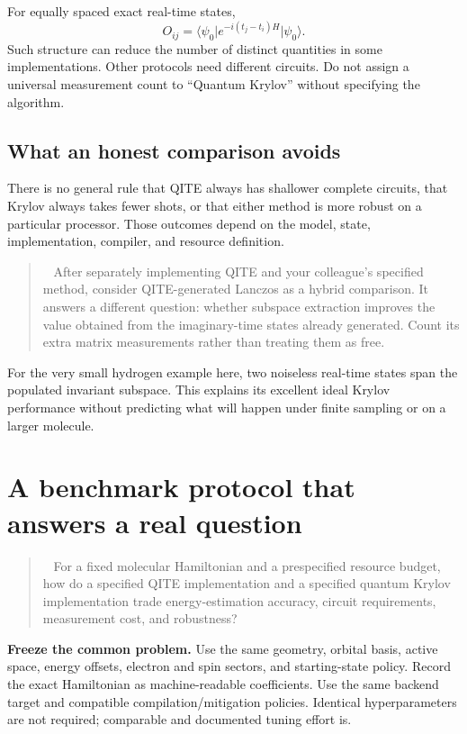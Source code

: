 \documentclass[11pt,a4paper]{article}
\newcommand{\ket}[1]{\lvert #1\rangle}
\newcommand{\bra}[1]{\langle #1\rvert}
\newcommand{\lesson}[2]{\clearpage\section{#1}\label{#2}}
\newenvironment{idea}[1][Main idea]{\par\smallskip\begin{quotation}\noindent{\bfseries\textcolor{keyblue}{#1.}}\ }{\end{quotation}\smallskip}
\begin{document}
For equally spaced exact real-time states,
\[
O_{ij}=\bra{\psi_0}e^{-i(t_j-t_i)H}\ket{\psi_0}.
\]
Such structure can reduce the number of distinct quantities in some implementations. Other protocols need different circuits. Do not assign a universal measurement count to ``Quantum Krylov'' without specifying the algorithm.

\subsection*{What an honest comparison avoids}
There is no general rule that QITE always has shallower complete circuits, that Krylov always takes fewer shots, or that either method is more robust on a particular processor. Those outcomes depend on the model, state, implementation, compiler, and resource definition.

\begin{idea}[A useful optional third arm]
After separately implementing QITE and your colleague's specified method, consider QITE-generated Lanczos as a hybrid comparison. It answers a different question: whether subspace extraction improves the value obtained from the imaginary-time states already generated. Count its extra matrix measurements rather than treating them as free.
\end{idea}

For the very small hydrogen example here, two noiseless real-time states span the populated invariant subspace. This explains its excellent ideal Krylov performance without predicting what will happen under finite sampling or on a larger molecule.

\lesson{A benchmark protocol that answers a real question}{sec:benchmark}
\begin{idea}[Primary research question]
For a fixed molecular Hamiltonian and a prespecified resource budget, how do a specified QITE implementation and a specified quantum Krylov implementation trade energy-estimation accuracy, circuit requirements, measurement cost, and robustness?
\end{idea}

\textbf{Freeze the common problem.} Use the same geometry, orbital basis, active space, energy offsets, electron and spin sectors, and starting-state policy. Record the exact Hamiltonian as machine-readable coefficients. Use the same backend target and compatible compilation/mitigation policies. Identical hyperparameters are not required; comparable and documented tuning effort is.
\end{document}
